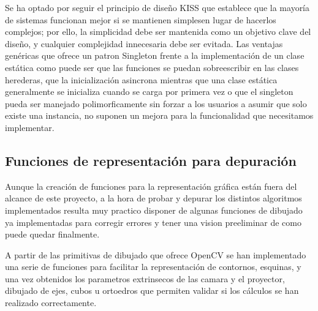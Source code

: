 Se ha optado por seguir el principio de diseño \acs{KISS} que establece que la mayoría de sistemas funcionan mejor si se mantienen simplesen lugar de hacerlos complejos; por ello, la simplicidad debe ser mantenida como un objetivo clave del diseño, y cualquier complejidad innecesaria debe ser evitada. Las ventajas genéricas que ofrece un patron Singleton frente a la implementación de un clase estática como puede ser que las funciones se puedan sobreescribir en las clases herederas, que la inicialización asincrona mientras que una clase estática generalmente se inicializa cuando se carga por primera vez o que el singleton pueda ser manejado polimorficamente sin forzar a los usuarios a asumir que solo existe una instancia, no suponen un mejora para la funcionalidad que necesitamos implementar. 

\subsection{Funciones de representación para depuración}
Aunque la creación de funciones para la representación gráfica están fuera del alcance de este proyecto, a la hora de probar y depurar los distintos algoritmos implementados resulta muy practico disponer de algunas funciones de dibujado ya implementadas para corregir errores y tener una vision preeliminar de como puede quedar finalmente.

A partir de las primitivas de dibujado que ofrece OpenCV se han implementado una serie de funciones para facilitar la representación de contornos, esquinas, y una vez obtenidos los parametros extrinsecos de las camara y el proyector, dibujado de ejes, cubos u ortoedros que permiten validar si los cálculos se han realizado correctamente.





